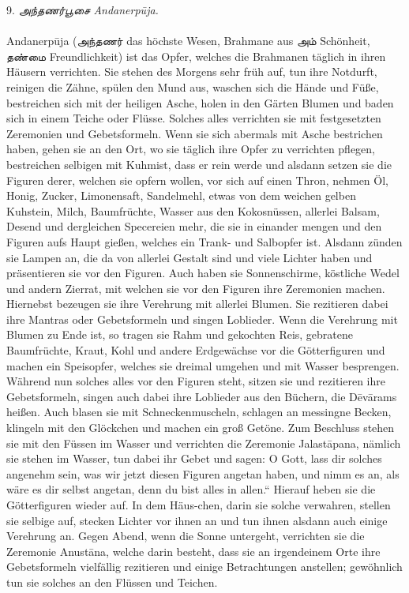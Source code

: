 \documentclass{article}
\newcommand{\TamilText}[1]{\texttamil{#1}}
\newcommand{\tam}[1]{\TamilText{#1}}
\begin{document}
\begin{center}
9. \emph{\tam{அந்தணர்பூசை} Andanerp\={u}ja.}
\end{center}
\paragraph{}
Andanerp\={u}ja (\tam{அந்தணர்} das höchste Wesen, Brahmane aus \tam{அம்} Schönheit, \tam{தண்மை} Freundlichkeit) ist das Opfer, welches die Brahmanen täglich in ihren Häusern verrichten. Sie stehen des Morgens sehr früh auf, tun ihre Notdurft, reinigen die Zähne, spülen den Mund aus, waschen sich die Hände und Füße, bestreichen sich mit der heiligen Asche, holen in den Gärten Blumen und baden sich in einem Teiche oder Flüsse. Solches alles verrichten sie mit festgesetzten Zeremonien und Gebetsformeln. Wenn sie sich abermals mit Asche bestrichen haben, gehen sie an den Ort, wo sie täglich ihre Opfer zu verrichten pflegen, bestreichen selbigen mit Kuhmist, dass er rein werde und alsdann setzen sie die Figuren derer, welchen sie opfern wollen, vor sich auf einen Thron, nehmen Öl, Honig, Zucker, Limonensaft, Sandelmehl, etwas von dem weichen gelben Kuhstein, Milch, Baumfrüchte, Wasser aus den Kokosnüssen, allerlei Balsam, Desend und dergleichen Specereien mehr, die sie in einander mengen und den Figuren aufs Haupt gießen, welches ein Trank- und Salbopfer ist. Alsdann zünden sie Lampen an, die da von allerlei Gestalt sind und viele Lichter haben und präsentieren sie vor den Figuren. Auch haben sie Sonnenschirme, köstliche Wedel und andern Zierrat, mit welchen sie vor den Figuren ihre Zeremonien machen. Hiernebst bezeugen sie ihre Verehrung mit allerlei Blumen. Sie rezitieren dabei ihre Mantras oder Gebetsformeln und singen Loblieder. Wenn die Verehrung mit Blumen zu Ende ist, so tragen sie Rahm und gekochten Reis, gebratene Baumfrüchte, Kraut, Kohl und andere Erdgewächse vor die Götterfiguren und machen ein Speisopfer, welches sie dreimal umgehen und mit Wasser besprengen. Während nun solches alles vor den Figuren steht, sitzen sie und rezitieren ihre Gebetsformeln, singen auch dabei ihre Loblieder aus den Büchern, die D\={e}v\={a}rams heißen. Auch blasen sie mit Schneckenmuscheln, schlagen an messingne Becken, klingeln mit den Glöckchen und machen ein groß Getöne. Zum Beschluss stehen sie mit den Füssen im Wasser und verrichten die Zeremonie Jalast\={a}pana, nämlich sie stehen im Wasser, tun dabei ihr Gebet und sagen: O Gott, lass dir solches angenehm sein, was wir jetzt diesen Figuren angetan haben, und nimm es an, als wäre es dir selbst angetan, denn du bist alles in allen.“ Hierauf heben sie die Götterfiguren wieder auf. In dem Häus-chen, darin sie solche verwahren, stellen sie selbige auf, stecken Lichter vor ihnen an und tun ihnen alsdann auch einige Verehrung an. Gegen Abend, wenn die Sonne untergeht, verrichten sie die Zeremonie Anust\={a}na, welche darin besteht, dass sie an irgendeinem Orte ihre Gebetsformeln vielfällig rezitieren und einige Betrachtungen anstellen; gewöhnlich tun sie solches an den Flüssen und Teichen.
\end{document}
